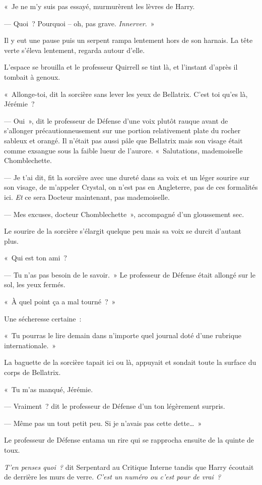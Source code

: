 «~Je ne m'y suis pas essayé, murmurèrent les lèvres de Harry.

--- Quoi~? Pourquoi -- oh, pas grave. \emph{Innerver}.~»

Il y eut une pause puis un serpent rampa lentement hors de son harnais. La tête verte s'éleva lentement, regarda autour d'elle.

L'espace se brouilla et le professeur Quirrell se tint là, et l'instant d'après il tombait à genoux.

«~Allonge-toi, dit la sorcière sans lever les yeux de Bellatrix. C'est toi qu'es là, Jérémie~?

--- Oui~», dit le professeur de Défense d'une voix plutôt rauque avant de s'allonger précautionneusement sur une portion relativement plate du rocher sableux et orangé. Il n'était pas aussi pâle que Bellatrix mais son visage était comme exsangue sous la faible lueur de l'aurore. «~Salutations, mademoiselle Chomblechette.

--- Je t'ai dit, fit la sorcière avec une dureté dans sa voix et un léger sourire sur son visage, de m'appeler Crystal, on n'est pas en Angleterre, pas de ces formalités ici. \emph{Et} ce sera Docteur maintenant, pas mademoiselle.

--- Mes excuses, docteur Chomblechette~», accompagné d'un gloussement sec.

Le sourire de la sorcière s'élargit quelque peu mais sa voix se durcit d'autant plus.

«~Qui est ton ami~?

--- Tu n'as pas besoin de le savoir.~» Le professeur de Défense était allongé sur le sol, les yeux fermés.

«~À quel point ça a mal tourné~?~»

Une sécheresse certaine~:

«~Tu pourras le lire demain dans n'importe quel journal doté d'une rubrique internationale.~»

La baguette de la sorcière tapait ici ou là, appuyait et sondait toute la surface du corps de Bellatrix.

«~Tu m'as manqué, Jérémie.

--- Vraiment~? dit le professeur de Défense d'un ton légèrement surpris.

--- Même pas un tout petit peu. Si je n'avais pas cette dette…~»

Le professeur de Défense entama un rire qui se rapprocha ensuite de la quinte de toux.

\emph{T'en penses quoi~?} dit Serpentard au Critique Interne tandis que Harry écoutait de derrière les murs de verre. \emph{C'est un numéro ou c'est pour de vrai~?}

